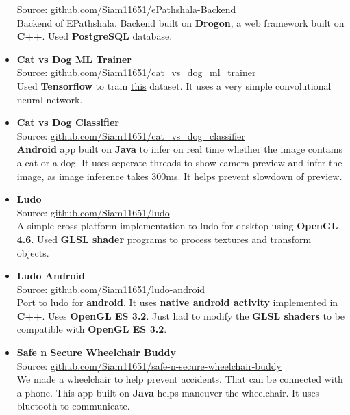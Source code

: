 \begin{itemize}
{    Source: \href{https://github.com/Siam11651/ePathshala-Backend}{github.com/Siam11651/ePathshala-Backend} \\
    Backend of EPathshala. Backend built on \textbf{Drogon}, a web framework built on \textbf{C++}. Used \textbf{PostgreSQL} database.
  }
  \item {
      \textbf{Cat vs Dog ML Trainer} \\
      Source: \href{https://github.com/Siam11651/cat_vs_dog_ml_trainer}{github.com/Siam11651/cat\_vs\_dog\_ml\_trainer} \\
      Used \textbf{Tensorflow} to train \href{https://www.kaggle.com/competitions/dogs-vs-cats}{this} dataset. It uses a very simple convolutional neural network.
  }
  \item {
    \textbf{Cat vs Dog Classifier} \\
    Source: \href{https://github.com/Siam11651/cat_vs_dog_classifier}{github.com/Siam11651/cat\_vs\_dog\_classifier} \\
    \textbf{Android} app built on \textbf{Java} to infer on real time whether the image contains a cat or a dog. It uses seperate threads to show camera preview and infer the image, as image inference takes 300ms. It helps prevent slowdown of preview.
  }
  \item {
    \textbf{Ludo} \\
    Source: \href{https://github.com/Siam11651/ludo}{github.com/Siam11651/ludo} \\
    A simple cross-platform implementation to ludo for desktop using \textbf{OpenGL 4.6}. Used \textbf{GLSL shader} programs to process textures and transform objects.
  }
  \item {
    \textbf{Ludo Android} \\
    Source: \href{https://github.com/Siam11651/ludo-android}{github.com/Siam11651/ludo-android} \\
    Port to ludo for \textbf{android}. It uses \textbf{native android activity} implemented in \textbf{C++}. Uses \textbf{OpenGL ES 3.2}. Just had to modify the \textbf{GLSL shaders} to be compatible with \textbf{OpenGL ES 3.2}.
  }
  \item {
    \textbf{Safe n Secure Wheelchair Buddy} \\
    Source: \href{https://github.com/Siam11651/safe-n-secure-wheelchair-buddy}{github.com/Siam11651/safe-n-secure-wheelchair-buddy} \\
    We made a wheelchair to help prevent accidents. That can be connected with a phone. This app built on \textbf{Java} helps maneuver the wheelchair. It uses bluetooth to communicate.
}
\end{itemize}
